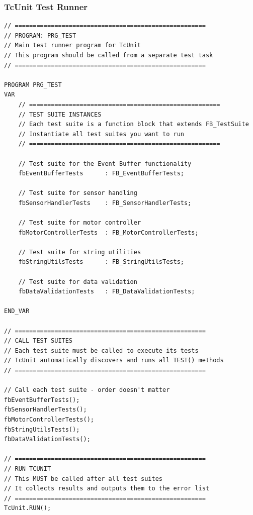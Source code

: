 \documentclass[11pt,a4paper]{article}
\begin{document}
\subsubsection*{TcUnit Test Runner}

\begin{lstlisting}
// =====================================================
// PROGRAM: PRG_TEST
// Main test runner program for TcUnit
// This program should be called from a separate test task
// =====================================================

PROGRAM PRG_TEST
VAR
    // =====================================================
    // TEST SUITE INSTANCES
    // Each test suite is a function block that extends FB_TestSuite
    // Instantiate all test suites you want to run
    // =====================================================
    
    // Test suite for the Event Buffer functionality
    fbEventBufferTests      : FB_EventBufferTests;
    
    // Test suite for sensor handling
    fbSensorHandlerTests    : FB_SensorHandlerTests;
    
    // Test suite for motor controller
    fbMotorControllerTests  : FB_MotorControllerTests;
    
    // Test suite for string utilities
    fbStringUtilsTests      : FB_StringUtilsTests;
    
    // Test suite for data validation
    fbDataValidationTests   : FB_DataValidationTests;
    
END_VAR

// =====================================================
// CALL TEST SUITES
// Each test suite must be called to execute its tests
// TcUnit automatically discovers and runs all TEST() methods
// =====================================================

// Call each test suite - order doesn't matter
fbEventBufferTests();
fbSensorHandlerTests();
fbMotorControllerTests();
fbStringUtilsTests();
fbDataValidationTests();

// =====================================================
// RUN TCUNIT
// This MUST be called after all test suites
// It collects results and outputs them to the error list
// =====================================================
TcUnit.RUN();
\end{lstlisting}
\end{document}
